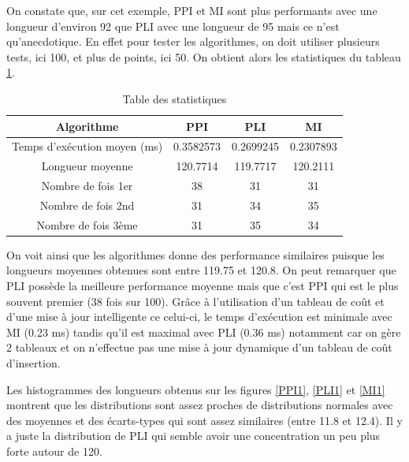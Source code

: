 \documentclass[10pt,a4paper]{article}
\begin{document}
On constate que, sur cet exemple, PPI et MI sont plus performants avec une longueur d'environ
92 que PLI avec une longueur de 95 mais ce n'est qu'anecdotique. En effet pour tester les algorithmes,
on doit utiliser plusieurs tests, ici 100, et plus de points, ici 50.
On obtient alors les statistiques du tableau \ref{stats}.

\begin{table}[!ht]
    \begin{center}
        \begin{tabular}{ |c|c|c|c| }
            \hline
            	Algorithme	&		PPI		    &		PLI	&		MI\\
            \hline
            Temps d'exécution moyen (ms)		&		0.3582573	&		0.2699245	&		0.2307893\\
            \hline
            Longueur moyenne		&		120.7714		&		119.7717		&		120.2111\\
            \hline
            Nombre de fois 1er		&		38	&		31	&		31\\
            \hline
            Nombre de fois 2nd		&		31	&		34		    &		35\\
            \hline
            Nombre de fois 3ème		&		31		&		35		    &		34\\
            \hline
        \end{tabular}
    \end{center}   
    \caption{Table des statistiques}
    \label{stats}    
\end{table}

On voit ainsi que les algorithmes donne des performance similaires puisque les longueurs moyennes
obtenues sont entre 119.75 et 120.8. On peut remarquer que PLI possède la meilleure performance
moyenne mais que c'est PPI qui est le plus souvent premier (38 fois sur 100). Grâce à 
l'utilisation d'un tableau de coût et d'une mise à jour intelligente ce celui-ci, le temps d'exécution
est minimale avec MI (0.23 ms) tandis qu'il est maximal avec PLI (0.36 ms) notamment
car on gère 2 tableaux et on n'effectue pas une mise à jour dynamique d'un tableau de coût d'insertion.

\clearpage

Les histogrammes des longueurs obtenus sur les figures \ref{PPI1}, \ref{PLI1} et \ref{MI1} montrent que les distributions sont assez proches de distributions normales avec des moyennes
et des écarts-types qui sont assez similaires (entre 11.8 et 12.4). Il y a juste la distribution de PLI qui semble avoir
une concentration un peu plus forte autour de 120.
\end{document}
